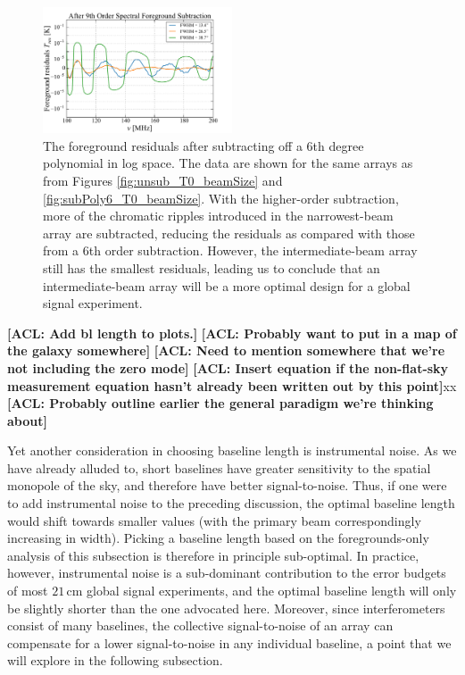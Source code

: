 \documentclass[twolcolumn,apj,iop,numberedappendix]{emulateapj}
\newcommand{\acl}[1]{{\color{red} \textbf{[ACL:  #1]}}}
\begin{document}
\begin{figure}[h]
	\centering
	\includegraphics[width=0.50\textwidth]{figures/subPoly9_T0_beamSize.pdf}
	\caption{The foreground residuals after subtracting off a $6$th degree polynomial in log space. The data are shown for the same arrays as from Figures \ref{fig:unsub_T0_beamSize} and \ref{fig:subPoly6_T0_beamSize}. With the higher-order subtraction, more of the chromatic ripples introduced in the narrowest-beam array are subtracted, reducing the residuals as compared with those from a $6$th order subtraction. However, the intermediate-beam array still has the smallest residuals, leading us to conclude that an intermediate-beam array will be a more optimal design for a global signal experiment.}
	\label{fig:subPoly9_T0_beamSize}
\end{figure}

\acl{Add bl length to plots.}
\acl{Probably want to put in a map of the galaxy somewhere}
\acl{Need to mention somewhere that we're not including the zero mode}
\acl{Insert equation if the non-flat-sky measurement equation hasn't already been written out by this point}xx
\acl{Probably outline earlier the general paradigm we're thinking about}

Yet another consideration in choosing baseline length is instrumental noise. As we have already alluded to, short baselines have greater sensitivity to the spatial monopole of the sky, and therefore have better signal-to-noise. Thus, if one were to add instrumental noise to the preceding discussion, the optimal baseline length would shift towards smaller values (with the primary beam correspondingly increasing in width). Picking a baseline length based on the foregrounds-only analysis of this subsection is therefore in principle sub-optimal. In practice, however, instrumental noise is a sub-dominant contribution to the error budgets of most $21\,\textrm{cm}$ global signal experiments, and the optimal baseline length will only be slightly shorter than the one advocated here. Moreover, since interferometers consist of many baselines, the collective signal-to-noise of an array can compensate for a lower signal-to-noise in any individual baseline, a point that we will explore in the following subsection.
\end{document}
